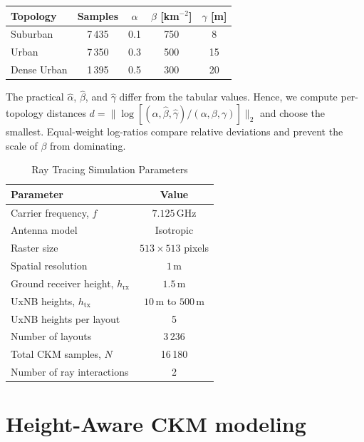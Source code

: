 \documentclass[10pt,conference,letterpaper]{IEEEtran}
\begin{document}
    \begin{center}
    \small
    \begin{tabular}{|l|c|c|c|c|}
    \hline
    {Topology} & {Samples} & $\alpha$ & $\beta$ [km$^{-2}$] & $\gamma$ [m] \\ \hline
    Suburban    & 7\,435 & 0.1 & 750 & 8  \\ \hline
    Urban       & 7\,350 & 0.3 & 500 & 15 \\ \hline
    Dense Urban & 1\,395 & 0.5 & 300 & 20 \\ \hline
    \end{tabular}
    \end{center}
The practical $\hat\alpha$, $\hat\beta$, and $\hat\gamma$ differ from the tabular values. Hence, we compute per-topology distances $d=\|\log[(\hat\alpha,\hat\beta,\hat\gamma)/(\alpha,\beta,\gamma)]\|_2$ and choose the smallest. Equal-weight
log-ratios compare relative deviations and prevent the scale of $\beta$ from
dominating. %
    
\begin{table}[]
\centering
\caption{Ray Tracing Simulation Parameters}
\label{tab:rt_params}
\begin{tabular}{lc}
\hline
{Parameter} & {Value} \\ \hline
Carrier frequency, $f$ & $7.125\,\text{GHz}$ \\
Antenna model & Isotropic \\
Raster size & $513\times513$ pixels\\
Spatial resolution & $1\,\text{m}$ \\
Ground receiver height, $h_{\text{rx}}$ & $1.5\,\text{m}$ \\
UxNB heights, $h_{\text{tx}}$ & $10\,\text{m}$ to $500\,\text{m}$ \\
UxNB heights per layout & 5 \\
Number of layouts & 3\,236 \\
Total CKM samples, $N$ & 16\,180 \\
Number of ray interactions & 2 \\
\hline
\end{tabular}
\vspace{-0.2cm}
\end{table}

\section{Height-Aware CKM modeling}\label{sec:ckm_model}
\end{document}
